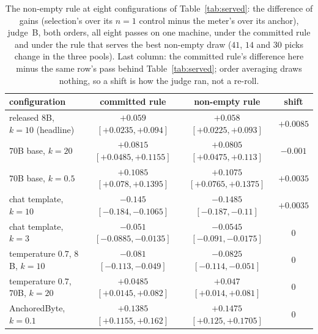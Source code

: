 \begin{table}[ht]
\centering\footnotesize
\caption{The non-empty rule at eight configurations of Table~\ref{tab:served}: the difference of gains
(selection's over its $n=1$ control minus the meter's over its anchor), judge~B, both orders, all eight
passes on one machine, under the committed rule and under the rule that serves the best non-empty draw
($41$, $14$ and $30$ picks change in the three pools). Last column: the committed rule's difference here
minus the same row's pass behind Table~\ref{tab:served}; order averaging draws nothing, so a shift is how
the judge ran, not a re-roll.}
\label{tab:nonempty}
\setlength{\tabcolsep}{4pt}
\begin{tabular}{@{}lccc@{}}
\toprule
configuration & committed rule & non-empty rule & shift \\
\midrule
released $8$B, $k=10$ (headline) & $+0.059$ $[+0.0235, +0.094]$ & $+0.058$ $[+0.0225, +0.093]$ & $+0.0085$ \\
$70$B base, $k=20$ & $+0.0815$ $[+0.0485, +0.1155]$ & $+0.0805$ $[+0.0475, +0.113]$ & $-0.001$ \\
$70$B base, $k=0.5$ & $+0.1085$ $[+0.078, +0.1395]$ & $+0.1075$ $[+0.0765, +0.1375]$ & $+0.0035$ \\
chat template, $k=10$ & $-0.145$ $[-0.184, -0.1065]$ & $-0.1485$ $[-0.187, -0.11]$ & $+0.0035$ \\
chat template, $k=3$ & $-0.051$ $[-0.0885, -0.0135]$ & $-0.0545$ $[-0.091, -0.0175]$ & $0$ \\
temperature $0.7$, $8$B, $k=10$ & $-0.081$ $[-0.113, -0.049]$ & $-0.0825$ $[-0.114, -0.051]$ & $0$ \\
temperature $0.7$, $70$B, $k=20$ & $+0.0485$ $[+0.0145, +0.082]$ & $+0.047$ $[+0.014, +0.081]$ & $0$ \\
AnchoredByte, $k=0.1$ & $+0.1385$ $[+0.1155, +0.162]$ & $+0.1475$ $[+0.125, +0.1705]$ & $0$ \\
\bottomrule
\end{tabular}
\end{table}


